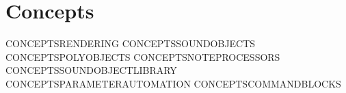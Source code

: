 \section{Concepts}\label{concepts}

CONCEPTSRENDERING CONCEPTSSOUNDOBJECTS CONCEPTSPOLYOBJECTS
CONCEPTSNOTEPROCESSORS CONCEPTSSOUNDOBJECTLIBRARY
CONCEPTSPARAMETERAUTOMATION CONCEPTSCOMMANDBLOCKS
